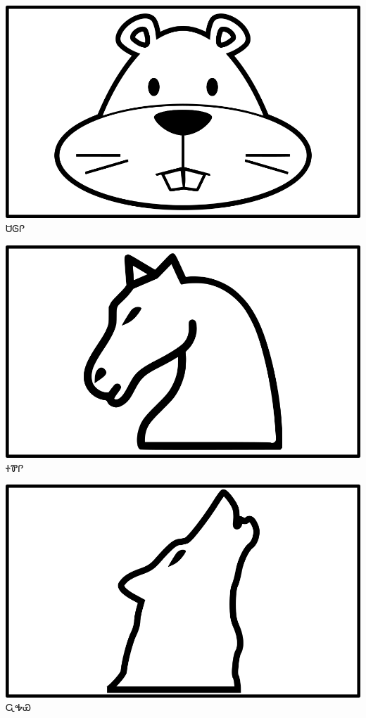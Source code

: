 \documentclass[avery5371]{flashcards}%
\begin{document}
    \begin{flashcard}{
        \includegraphics[width=0.95\columnwidth,height=.51\columnwidth,keepaspectratio]{../artwork/objects-animate/saloli}
    }
        \Huge ᏌᎶᎵ
    \end{flashcard}

    \begin{flashcard}{
        \includegraphics[width=0.95\columnwidth,height=.51\columnwidth,keepaspectratio]{../artwork/objects-animate/soquili}
    }
        \Huge ᏐᏈᎵ
    \end{flashcard}

    \begin{flashcard}{
        \includegraphics[width=0.95\columnwidth,height=.51\columnwidth,keepaspectratio]{../artwork/objects-animate/wahya}
    }
        \Huge ᏩᎭᏯ
    \end{flashcard}
\end{document}
